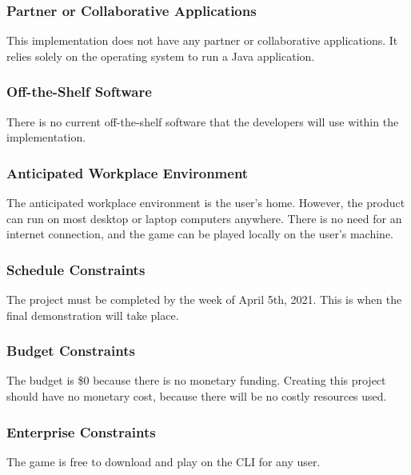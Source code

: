 \documentclass[12pt, titlepage]{article}
\begin{document}
\subsubsection{Partner or Collaborative Applications}
This implementation does not have any partner or collaborative applications. It relies solely on the operating system to run a Java application.

\subsubsection{Off-the-Shelf Software}
There is no current off-the-shelf software that the developers will use within the implementation. 

\subsubsection{Anticipated Workplace Environment}
The anticipated workplace environment is the user's home. However, the product can run on most desktop or laptop computers anywhere. There is no need for an internet connection, and the game can be played locally on the user's machine.

\subsubsection{Schedule Constraints}
The project must be completed by the week of April 5th, 2021. This is when the final demonstration will take place.

\subsubsection{Budget Constraints}
The budget is \$0 because there is no monetary funding. Creating this project should have no monetary cost, because there will be no costly resources used.

\subsubsection{Enterprise Constraints}
The game is free to download and play on the CLI for any user.
\end{document}
